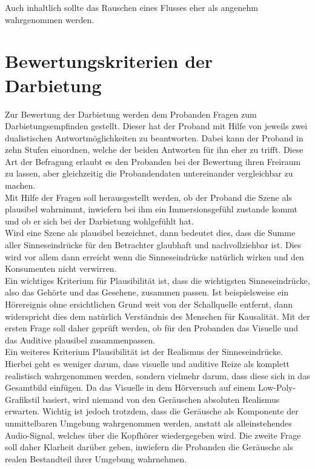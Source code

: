Auch inhaltlich sollte das Rauschen eines Flusses eher als angenehm wahrgenommen werden. 
 \vspace*{20pt}
 \section{Bewertungskriterien der Darbietung}
 Zur Bewertung der Darbietung werden dem Probanden Fragen zum Darbietungsempfinden gestellt. Dieser hat der Proband mit Hilfe von jeweils  zwei dualistischen  Antwortmöglichkeiten zu beantworten. Dabei kann der Proband in zehn Stufen einordnen, welche der beiden Antworten für ihn eher zu trifft. Diese Art der Befragung erlaubt es den Probanden bei der Bewertung ihren Freiraum zu lassen, aber gleichzeitig die Probandendaten untereinander vergleichbar zu machen.  \\
 
 Mit Hilfe der Fragen soll herausgestellt werden, ob der Proband die Szene als plausibel wahrnimmt, inwiefern bei ihm ein Immersionsgefühl zustande kommt und ob er sich bei der Darbietung wohlgefühlt hat. \\
 
 Wird eine Szene als plausibel bezeichnet, dann bedeutet dies, dass die Summe aller Sinneseindrücke für den Betrachter glaubhaft und nachvollziehbar ist. Dies wird vor allem dann erreicht wenn die Sinneseindrücke natürlich wirken und den Konsumenten nicht verwirren. \\
 
 Ein wichtiges Kriterium für Plausibilität ist, dass die wichtigsten Sinneseindrücke, also das Gehörte und das Gesehene, zusammen passen. Ist beispielsweise ein Hörereignis ohne ersichtlichen Grund weit von der Schallquelle entfernt, dann widerspricht dies dem natürlich Verständnis des Menschen für Kausalität. Mit der ersten Frage soll daher geprüft werden, ob für den Probanden das Visuelle und das Auditive plausibel zusammenpassen.\\
 
 Ein weiteres Kriterium Plausibilität ist der Realismus der Sinneseindrücke. Hierbei geht es weniger darum, dass visuelle und auditive Reize als komplett realistisch wahrgenommen werden, sondern vielmehr darum, dass diese sich in das Gesamtbild einfügen. Da das Visuelle in dem Hörversuch auf einem Low-Poly-Grafikstil basiert, wird niemand von den Geräuschen absoluten Realismus erwarten. Wichtig ist jedoch trotzdem, dass die Geräusche als Komponente der unmittelbaren Umgebung wahrgenommen werden, anstatt als alleinstehendes Audio-Signal, welches über die Kopfhörer wiedergegeben wird. Die zweite Frage soll daher Klarheit darüber geben, inwiefern die Probanden die Geräusche als realen Bestandteil ihrer Umgebung wahrnehmen. \\
 
